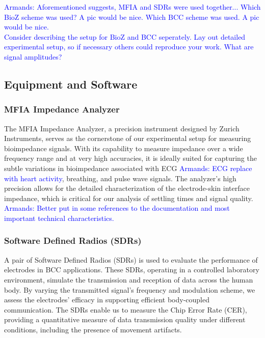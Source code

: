 \documentclass[conference]{IEEEtran}
\newcommand{\notea}[1]{\textcolor{blue}{Armands: #1}}
\begin{document}
\notea{Aforementioned suggests, MFIA and SDRs were used together... Which BioZ scheme was used? A pic would be nice. Which BCC scheme was used. A pic would be nice. \\ Consider describing the setup for BioZ and BCC seperately. Lay out detailed experimental setup, so if necessary others could reproduce your work. What are signal amplitudes?}

\subsection{Equipment and Software}

\subsubsection{MFIA Impedance Analyzer}
The MFIA Impedance Analyzer, a precision instrument designed by Zurich Instruments, serves as the cornerstone of our experimental setup for measuring bioimpedance signals. With its capability to measure impedance over a wide frequency range and at very high accuracies, it is ideally suited for capturing the subtle variations in bioimpedance associated with ECG \notea{ECG replace with heart activity}, breathing, and pulse wave signals. The analyzer's high precision allows for the detailed characterization of the electrode-skin interface impedance, which is critical for our analysis of settling times and signal quality. \notea{Better put in some references to the documentation and most important technical characteristics. }

\subsubsection{Software Defined Radios (SDRs)}
A pair of Software Defined Radios (SDRs) is used to evaluate the performance of electrodes in BCC applications. These SDRs, operating in a controlled laboratory environment, simulate the transmission and reception of data across the human body. By varying the transmitted signal's frequency and modulation scheme, we assess the electrodes' efficacy in supporting efficient body-coupled communication. The SDRs enable us to measure the Chip Error Rate (CER), providing a quantitative measure of data transmission quality under different conditions, including the presence of movement artifacts.
\end{document}
